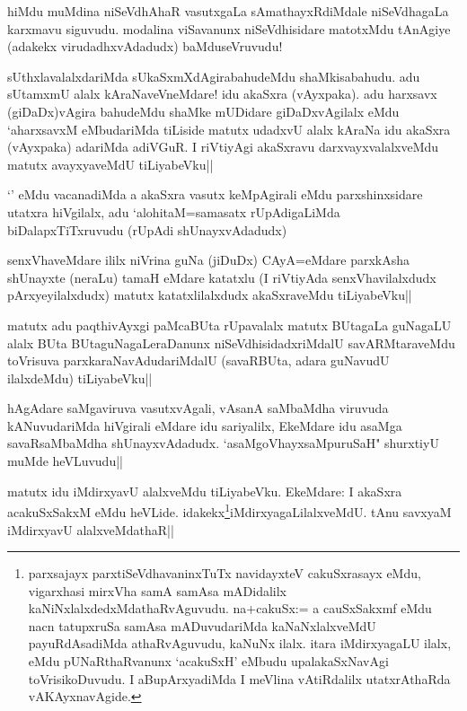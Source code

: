 
\begin{artha}
hiMdu muMdina niSeVdhAhaR vasutxgaLa sAmathayxRdiMdale niSeVdhagaLa karxmavu siguvudu. modalina viSavanunx niSeVdhisidare matotxMdu tAnAgiye (adakekx virudadhxvAdadudx) baMduseVruvudu!
\end{artha}%


\begin{artha}
sUthxlavalalxdariMda sUkaSxmXdAgirabahudeMdu shaMkisabahudu. adu sUtamxmU alalx kAraNaveVneMdare! idu akaSxra (vAyxpaka). adu harxsavx (giDaDx)vAgira bahudeMdu shaMke mUDidare giDaDxvAgilalx eMdu `aharxsavxM eMbudariMda tiLiside matutx udadxvU alalx kAraNa idu akaSxra (vAyxpaka) adariMda adiVGuR. I riVtiyAgi akaSxravu darxvayxvalalxveMdu matutx avayxyaveMdU tiLiyabeVku||
\end{artha}

\begin{artha}
`\stext ' eMdu vacanadiMda a akaSxra vasutx keMpAgirali eMdu parxshinxsidare utatxra hiVgilalx, adu `alohitaM=samasatx rUpAdigaLiMda biDalapxTiTxruvudu (rUpAdi shUnayxvAdadudx)
\end{artha}


\begin{artha}
senxVhaveMdare ililx niVrina guNa (jiDuDx) CAyA=eMdare parxkAsha shUnayxte (neraLu) tamaH eMdare katatxlu (I riVtiyAda senxVhavilalxdudx pArxyeyilalxdudx) matutx katatxlilalxdudx akaSxraveMdu tiLiyabeVku||
\end{artha}

\begin{artha}%
matutx adu paqthivAyxgi paMcaBUta rUpavalalx matutx BUtagaLa guNagaLU alalx BUta BUtaguNagaLeraDanunx niSeVdhisidadxriMdalU savARMtaraveMdu toVrisuva parxkaraNavAdudariMdalU (savaRBUta, adara guNavudU ilalxdeMdu) tiLiyabeVku||
\end{artha}

\begin{artha}
hAgAdare saMgaviruva vasutxvAgali, vAsanA saMbaMdha viruvuda kANuvudariMda hiVgirali eMdare idu sariyalilx, EkeMdare idu asaMga savaRsaMbaMdha shUnayxvAdadudx. `asaMgoVhayxsaMpuruSaH" shurxtiyU muMde heVLuvudu||
\end{artha}

\begin{artha}
matutx idu iMdirxyavU alalxveMdu tiLiyabeVku. EkeMdare: I akaSxra acakuSxSakxM eMdu heVLide. idakekx\footnote[1]{parxsajayx parxtiSeVdhavaninxTuTx navidayxteV cakuSxrasayx eMdu, vigarxhasi mirxVha samA samAsa mADidalilx kaNiNxlalxdedxMdathaRvAguvudu. na+cakuSx:= a cauSxSakxmf eMdu nacn tatupxruSa samAsa mADuvudariMda kaNaNxlalxveMdU payuRdAsadiMda athaRvAguvudu, kaNuNx ilalx. itara iMdirxyagaLU ilalx, eMdu pUNaRthaRvanunx `acakuSxH' eMbudu upalakaSxNavAgi toVrisikoDuvudu. I aBupArxyadiMda I meVlina vAtiRdalilx utatxrAthaRda vAKAyxnavAgide.}iMdirxyagaLilalxveMdU. tAnu savxyaM iMdirxyavU alalxveMdathaR||
\end{artha}

